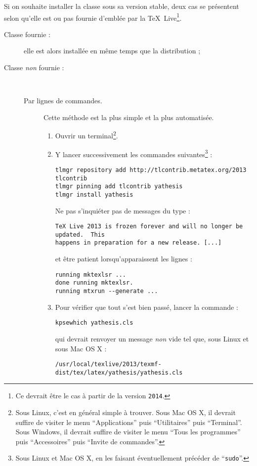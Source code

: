 Si on souhaite installer la classe sous sa version stable, deux cas se
présentent selon qu'elle est ou pas fournie d'emblée par la
\TeX~Live\footnote{Ce devrait être le cas à partir de la version
  \texttt{2014}.}.
\begin{description}
\item[Classe \yat{} fournie :] elle est alors installée en même temps que la
  distribution ;
\item[Classe \yat{} \emph{non} fournie :]\
  \begin{description}
  \item[Par lignes de commandes.] Cette méthode est la plus simple et la plus
    automatisée.
    \begin{enumerate}
    \item Ouvrir un terminal\footnote{Sous Linux, c'est en général simple
        à trouver. Sous Mac OS X, il devrait suffire de visiter le menu
        \enquote{Applications} puis \enquote{Utilitaires} puis
        \enquote{Terminal}. Sous Windows, il devrait suffire de visiter le menu
        \enquote{Tous les programmes} puis \enquote{Accessoires} puis
        \enquote{Invite de commandes}.}.
    \item Y lancer successivement les commandes suivantes\footnote{Sous Linux
        et Mac OS X, en les faisant éventuellement précéder de
        \enquote{\protect\lstinline|sudo|}.} :
\begin{lstlisting}
tlmgr repository add http://tlcontrib.metatex.org/2013  tlcontrib
tlmgr pinning add tlcontrib yathesis
tlmgr install yathesis
\end{lstlisting}
      Ne pas s'inquiéter pas de messages du type :
\begin{lstlisting}
TeX Live 2013 is frozen forever and will no longer be updated.  This
happens in preparation for a new release. [...]
\end{lstlisting}
      et être patient lorsqu'apparaissent les lignes :
\begin{lstlisting}
running mktexlsr ...
done running mktexlsr.
running mtxrun --generate ...
\end{lstlisting}
    \item Pour vérifier que tout s'est bien passé, lancer la commande :
\begin{lstlisting}
kpsewhich yathesis.cls
\end{lstlisting}
      qui devrait renvoyer un message \emph{non} vide tel que, sous Linux et
      sous Mac OS X :
\begin{lstlisting}
/usr/local/texlive/2013/texmf-dist/tex/latex/yathesis/yathesis.cls

\end{lstlisting}
\end{enumerate}
\end{description}
\end{description}
